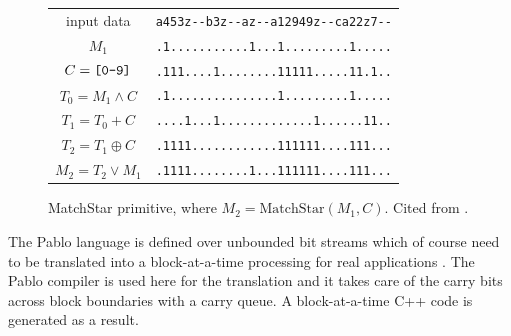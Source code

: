 \begin{figure}[tbh]
\begin{center}
\begin{tabular}{cr}\\
input data  & \verb`a453z--b3z--az--a12949z--ca22z7--`\\
$M_1$ & \verb`.1...........1...1.........1.....`\\
$C = \text{\tt [0-9]}$ & \verb`.111....1........11111.....11.1..`\\
$T_0 = M_1 \wedge C$ & \verb`.1...............1.........1.....`\\
$T_1 = T_0 + C$ & \verb`....1...1.............1......11..`\\
$T_2 = T_1 \oplus C$ & \verb`.1111............111111....111...`\\
$M_2 = T_2 \vee M_1$ & \verb`.1111........1...111111....111...`
\end{tabular}
\end{center}
\caption[MatchStar Using Bitstream Addition and Mask]{MatchStar primitive, where $M_2 = \text{MatchStar}(M_1, C)$. Cited from \cite{rob_regex}.}
\label{figure:matchstar}
\end{figure}

The Pablo language is defined over unbounded bit streams which of course need to be translated into a block-at-a-time processing for real applications \cite{rob_regex}. The Pablo compiler is used here for the translation and it takes care of the carry bits across block boundaries with a carry queue. A block-at-a-time C++ code is generated as a result.

